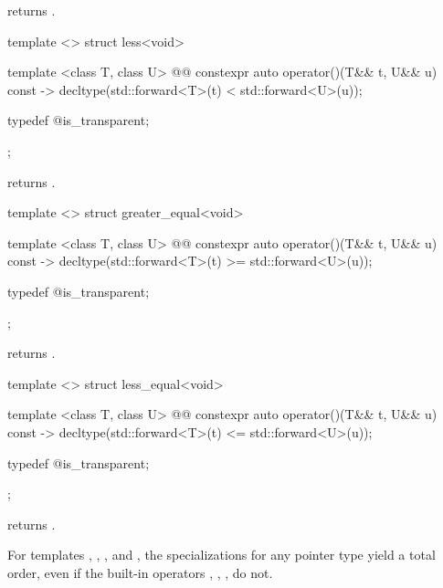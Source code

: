 \begin{itemdescr}
\pnum
{} returns .
\end{itemdescr}

%
\begin{itemdecl}
template <> struct less<void> {
  template <class T, class U>
    @@
  constexpr auto operator()(T&& t, U&& u) const
    -> decltype(std::forward<T>(t) < std::forward<U>(u));

  typedef @\unspec@ is_transparent;
};
\end{itemdecl}

\begin{itemdescr}
\pnum
{} returns .
\end{itemdescr}

%
\begin{itemdecl}
template <> struct greater_equal<void> {
  template <class T, class U>
    @@
  constexpr auto operator()(T&& t, U&& u) const
    -> decltype(std::forward<T>(t) >= std::forward<U>(u));

  typedef @\unspec@ is_transparent;
};
\end{itemdecl}

\begin{itemdescr}
\pnum
{} returns .
\end{itemdescr}

%
\begin{itemdecl}
template <> struct less_equal<void> {
  template <class T, class U>
    @@
  constexpr auto operator()(T&& t, U&& u) const
    -> decltype(std::forward<T>(t) <= std::forward<U>(u));

  typedef @\unspec@ is_transparent;
};
\end{itemdecl}

\begin{itemdescr}
\pnum
{} returns .
\end{itemdescr}

\pnum
For templates , , , and
, the specializations for any pointer type yield a total order,
even if the built-in operators \tcode{<}, \tcode{>}, \tcode{<=}, \tcode{>=}
do not.

